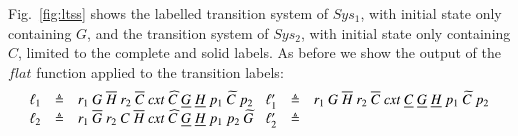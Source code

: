 Fig.~\ref{fig:ltss} shows the labelled transition system of $Sys_1$, with initial state only  containing  $G$,  and the transition system of $Sys_2$, with initial state only containing $C$, limited to the complete
and solid labels. As before we show the output of the $flat$ function applied to the transition labels:
{\footnotesize \[
\begin{array}{lcl@{\hspace{0.3cm}} lcl}
\ell_1 &\defeq & 
r_1~G~\overline{H}~r_2~\overline{C}~\mathit{cxt}~\widehat{C}~\underline{G}~\underline{H}~p_1~\widetilde{C}~p_2
&
\ell'_1 &\defeq & 
r_1~G~\overline{H}~r_2~\overline{C}~\mathit{cxt}~\underline{C}~\underline{G}~\underline{H}~p_1~\widetilde{C}~p_2\\
\ell_2 &\defeq &
r_1~\overline{G}~r_2~C~\overline{H}~\mathit{cxt}~\widehat{C}~\underline{G}~\underline{H}~p_1~p_2~\widetilde{G}
&
\ell'_2 &\defeq & 

\end{array}\]}
